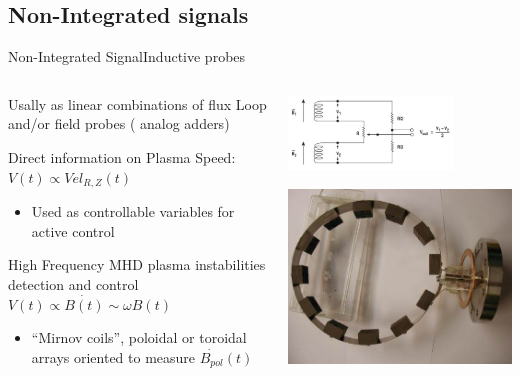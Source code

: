 \documentclass{beamer}
\begin{document}
\subsection{Non-Integrated signals}
\begin{frame}{Non-Integrated Signal}{Inductive probes}
\begin{columns}
	\begin{itemize}
		 { \item Usally as linear combinations of flux Loop and/or field probes ( analog adders)
			        \item Direct information on Plasma Speed:  $V(t) \propto Vel_{R,Z}(t)$
			\begin{itemize}
				\item Used as controllable variables for active control
			\end{itemize}
 		}
		 {\item High Frequency MHD plasma instabilities  detection and control $V(t) \propto \dot{B(t)}  \sim \omega B(t)$
			\begin{itemize}
				\item “Mirnov coils”, poloidal or toroidal arrays  oriented to measure $\dot{B_{pol}}(t) $%
			\end{itemize}
		}
	\end{itemize}

	\begin{center}
		\includegraphics[trim = 0mm 0mm 0mm 1mm, clip, height = 2cm]{probesSum.png}

		\includegraphics[height = 2.cm]{isttokMirn.jpg}
	\end{center}
\end{columns}
\end{frame}
\end{document}
